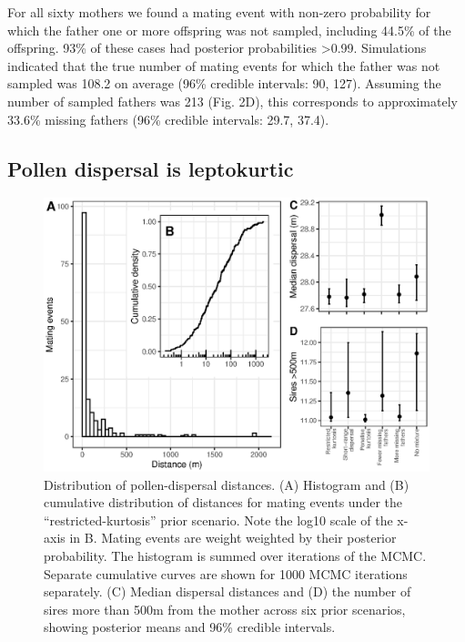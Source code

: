 \documentclass[10pt, a4paper, twocolumn]{article} %
\begin{document}
For all sixty mothers we found a mating event with non-zero probability for which the father one or more offspring was not sampled, including 44.5\% of the offspring. 93\% of these cases had posterior probabilities >0.99. Simulations indicated that the true number of mating events for which the father was not sampled was 108.2 on average (96\% credible intervals: 90, 127). Assuming the number of sampled fathers was 213 (Fig. 2D), this corresponds to approximately 33.6\% missing fathers (96\% credible intervals: 29.7, 37.4).

\subsection{Pollen dispersal is leptokurtic}

\begin{figure}
    \centering
    \includegraphics{dispersal.eps}
    \caption{Distribution of pollen-dispersal distances.  (A) Histogram and (B) cumulative distribution of distances for mating events under the “restricted-kurtosis” prior scenario. Note the log10 scale of the x-axis in B. Mating events are weight weighted by their posterior probability. The histogram is summed over iterations of the MCMC. Separate cumulative curves are shown for 1000 MCMC iterations separately. (C) Median dispersal distances and (D) the number of sires more than 500m from the mother across six prior scenarios, showing posterior means and 96\% credible intervals.}
    \label{fig:dispersal}
\end{figure}
\end{document}
